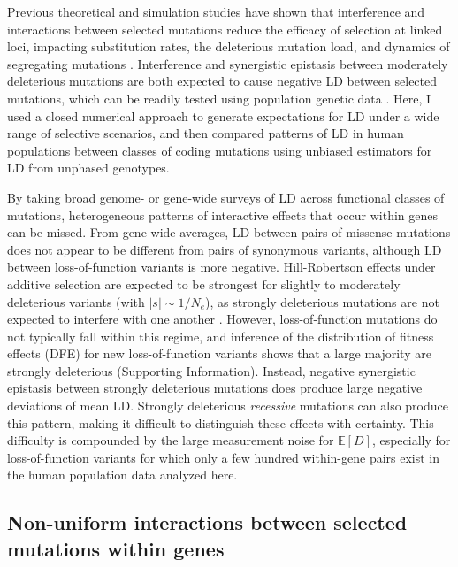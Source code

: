 \documentclass[]{article}
\newcommand{\E}{\mathbb{E}}
\begin{document}
Previous theoretical and simulation studies have shown that interference and
interactions between selected mutations reduce the efficacy of selection at
linked loci, impacting substitution rates, the deleterious mutation load, and
dynamics of segregating mutations
\citep{Hill1968-vu,Birky1988-jm,Barton1995-mj,McVean2000-ox}. Interference and
synergistic epistasis between moderately deleterious mutations are both
expected to cause negative LD between selected mutations, which can be readily
tested using population genetic data
\citep{Sohail2017-zq,Sandler2021-of,Garcia2021-zn}. Here, I used a closed
numerical approach to generate expectations for LD under a wide range of
selective scenarios, and then compared patterns of LD in human populations
between classes of coding mutations using unbiased estimators for LD from
unphased genotypes.

By taking broad genome- or gene-wide surveys of LD across functional classes of
mutations, heterogeneous patterns of interactive effects that occur within
genes can be missed. From gene-wide averages, LD between pairs of missense
mutations does not appear to be different from pairs of synonymous variants,
although LD between loss-of-function variants is more negative. Hill-Robertson
effects under additive selection are expected to be strongest for slightly to
moderately deleterious variants (with \(|s|\sim 1/N_e\)), as strongly deleterious
mutations are not expected to interfere with one another \citep{McVean2000-ox}.
However, loss-of-function mutations do not typically fall within this regime,
and inference of the distribution of fitness effects (DFE) for new
loss-of-function variants shows that a large majority are strongly deleterious
(Supporting Information). Instead, negative synergistic epistasis between
strongly deleterious mutations does produce large negative deviations of mean
LD. Strongly deleterious \emph{recessive} mutations can also produce this
pattern, making it difficult to distinguish these effects with certainty. This
difficulty is compounded by the large measurement noise for \(\E[D]\),
especially for loss-of-function variants for which only a few hundred
within-gene pairs exist in the human population data analyzed here.

\subsection{Non-uniform interactions between selected mutations within genes}
\label{non-uniform-interactions-between-selected-mutations-within-genes}
\end{document}
